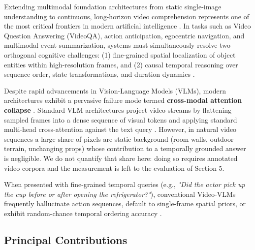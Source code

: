 \documentclass{article}
\begin{document}
Extending multimodal foundation architectures from static single-image understanding to continuous, long-horizon video comprehension represents one of the most critical frontiers in modern artificial intelligence \cite{arxiv_2010_11146,arxiv_2005_14165}. In tasks such as Video Question Answering (VideoQA), action anticipation, egocentric navigation, and multimodal event summarization, systems must simultaneously resolve two orthogonal cognitive challenges: (1) fine-grained spatial localization of object entities within high-resolution frames, and (2) causal temporal reasoning over sequence order, state transformations, and duration dynamics \cite{arxiv_2203_02155,arxiv_2312_03893}.

Despite rapid advancements in Vision-Language Models (VLMs), modern architectures exhibit a pervasive failure mode termed \textbf{cross-modal attention collapse} \cite{arxiv_2406_00584}. Standard VLM architectures project video streams by flattening sampled frames into a dense sequence of visual tokens and applying standard multi-head cross-attention against the text query \cite{arxiv_2305_18290}. However, in natural video sequences a large share of pixels are static background (room walls, outdoor terrain, unchanging props) whose contribution to a temporally grounded answer is negligible. We do not quantify that share here: doing so requires annotated video corpora and the measurement is left to the evaluation of Section 5.

When presented with fine-grained temporal queries (e.g., \textit{"Did the actor pick up the cup before or after opening the refrigerator?"}), conventional Video-VLMs frequently hallucinate action sequences, default to single-frame spatial priors, or exhibit random-chance temporal ordering accuracy \cite{arxiv_2405_01543,crossref_10_1016_j_aei_2026_104392}.


\subsection{Principal Contributions}
\end{document}
